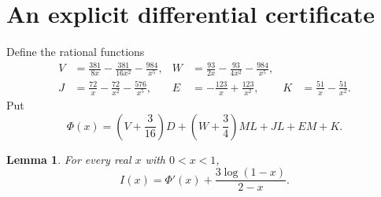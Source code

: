 \documentclass[11pt,a4paper]{article}
\newtheorem{lemma}[theorem]{Lemma}
\numberwithin{equation}{section}
\begin{document}
\section{An explicit differential certificate}
Define the rational functions
\begin{align}
 V&=\frac{381}{8x}-\frac{381}{16x^2}-\frac{984}{x^5},&
 W&=\frac{93}{2x}-\frac{93}{4x^2}-\frac{984}{x^5},\label{eq:VW}\\
 J&=\frac{72}{x}-\frac{72}{x^2}-\frac{576}{x^5},&
 E&=-\frac{123}{x}+\frac{123}{x^2},&
 K&=\frac{51}{x}-\frac{51}{x^2}.
 \label{eq:JEK}
\end{align}
Put
\begin{equation}\label{eq:Phi}
 \Phi(x)=\left(V+\frac3{16}\right)D
        +\left(W+\frac34\right)ML+JL+EM+K.
\end{equation}
\begin{lemma}\label{lem:certificate}
For every real $x$ with $0<x<1$,
\begin{equation}\label{eq:certificate}
 I(x)=\Phi'(x)+\frac{3\log(1-x)}{2-x}.
\end{equation}
\end{lemma}
\end{document}
